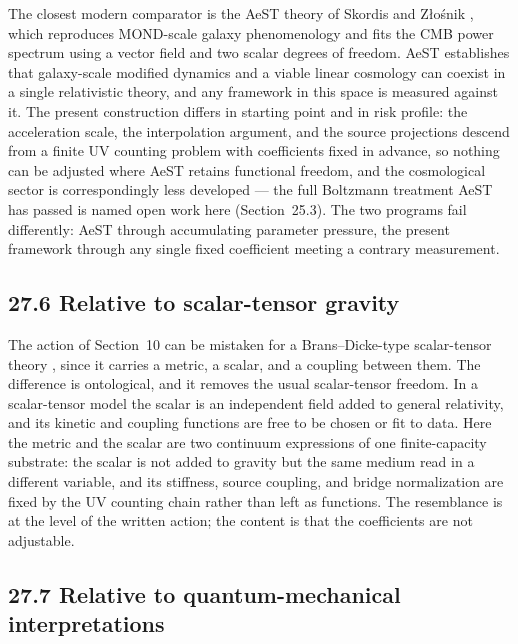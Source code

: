 \documentclass[11pt]{article}
\begin{document}
The closest modern comparator is the AeST theory of Skordis and Z\l{}o\'snik \citep{Skordis2021}, which reproduces MOND-scale galaxy phenomenology and fits the CMB power spectrum using a vector field and two scalar degrees of freedom. AeST establishes that galaxy-scale modified dynamics and a viable linear cosmology can coexist in a single relativistic theory, and any framework in this space is measured against it. The present construction differs in starting point and in risk profile: the acceleration scale, the interpolation argument, and the source projections descend from a finite UV counting problem with coefficients fixed in advance, so nothing can be adjusted where AeST retains functional freedom, and the cosmological sector is correspondingly less developed --- the full Boltzmann treatment AeST has passed is named open work here (Section~25.3). The two programs fail differently: AeST through accumulating parameter pressure, the present framework through any single fixed coefficient meeting a contrary measurement.

\subsection{27.6 Relative to scalar-tensor gravity}

The action of Section~10 can be mistaken for a Brans--Dicke-type scalar-tensor theory \citep{BransDicke1961}, since it carries a metric, a scalar, and a coupling between them. The difference is ontological, and it removes the usual scalar-tensor freedom. In a scalar-tensor model the scalar is an independent field added to general relativity, and its kinetic and coupling functions are free to be chosen or fit to data. Here the metric and the scalar are two continuum expressions of one finite-capacity substrate: the scalar is not added to gravity but the same medium read in a different variable, and its stiffness, source coupling, and bridge normalization are fixed by the UV counting chain rather than left as functions. The resemblance is at the level of the written action; the content is that the coefficients are not adjustable.

\subsection{27.7 Relative to quantum-mechanical interpretations}
\end{document}
